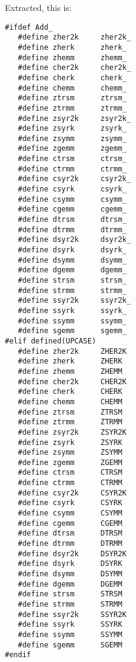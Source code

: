 \noindent
Extracted, this is:
\begin{verbatim}
#ifdef Add_
   #define zher2k     zher2k_
   #define zherk      zherk_
   #define zhemm      zhemm_
   #define cher2k     cher2k_
   #define cherk      cherk_
   #define chemm      chemm_
   #define ztrsm      ztrsm_
   #define ztrmm      ztrmm_
   #define zsyr2k     zsyr2k_
   #define zsyrk      zsyrk_
   #define zsymm      zsymm_
   #define zgemm      zgemm_
   #define ctrsm      ctrsm_
   #define ctrmm      ctrmm_
   #define csyr2k     csyr2k_
   #define csyrk      csyrk_
   #define csymm      csymm_
   #define cgemm      cgemm_
   #define dtrsm      dtrsm_
   #define dtrmm      dtrmm_
   #define dsyr2k     dsyr2k_
   #define dsyrk      dsyrk_
   #define dsymm      dsymm_
   #define dgemm      dgemm_
   #define strsm      strsm_
   #define strmm      strmm_
   #define ssyr2k     ssyr2k_
   #define ssyrk      ssyrk_
   #define ssymm      ssymm_
   #define sgemm      sgemm_
#elif defined(UPCASE)
   #define zher2k     ZHER2K
   #define zherk      ZHERK
   #define zhemm      ZHEMM
   #define cher2k     CHER2K
   #define cherk      CHERK
   #define chemm      CHEMM
   #define ztrsm      ZTRSM
   #define ztrmm      ZTRMM
   #define zsyr2k     ZSYR2K
   #define zsyrk      ZSYRK
   #define zsymm      ZSYMM
   #define zgemm      ZGEMM
   #define ctrsm      CTRSM
   #define ctrmm      CTRMM
   #define csyr2k     CSYR2K
   #define csyrk      CSYRK
   #define csymm      CSYMM
   #define cgemm      CGEMM
   #define dtrsm      DTRSM
   #define dtrmm      DTRMM
   #define dsyr2k     DSYR2K
   #define dsyrk      DSYRK
   #define dsymm      DSYMM
   #define dgemm      DGEMM
   #define strsm      STRSM
   #define strmm      STRMM
   #define ssyr2k     SSYR2K
   #define ssyrk      SSYRK
   #define ssymm      SSYMM
   #define sgemm      SGEMM
#endif
\end{verbatim}


